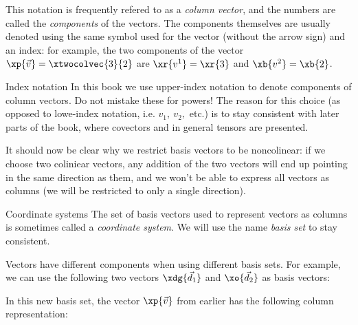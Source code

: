 This notation is frequently refered to as a \emph{column vector}, and the numbers are called the \emph{components} of the vectors. The components themselves are usually denoted using the same symbol used for the vector (without the arrow sign) and an index: for example, the two components of the vector $\xp{\vec{v}}=\xtwocolvec{3}{2}$ are $\xr{v^{1}}=\xr{3}$ and $\xb{v^{2}}=\xb{2}$.

\begin{note}{Index notation}{}
  In this book we use upper-index notation to denote components of column vectors. Do not mistake these for powers! The reason for this choice (as opposed to lowe-index notation, i.e. $v_{1},\ v_{2},$ etc.) is to stay consistent with later parts of the book, where covectors and in general tensors are presented.
\end{note}

It should now be clear why we restrict basis vectors to be noncolinear: if we choose two coliniear vectors, any addition of the two vectors will end up pointing in the same direction as them, and we won't be able to express all vectors as columns (we will be restricted to only a single direction).

\begin{note}{Coordinate systems}{}
  The set of basis vectors used to represent vectors as columns is sometimes called a \emph{coordinate system}. We will use the name \emph{basis set} to stay consistent.
\end{note}

Vectors have different components when using different basis sets. For example, we can use the following two vectors $\xdg{\vec{d}_{1}}$ and $\xo{\vec{d}_{2}}$ as basis vectors:

\begin{center}
\end{center}

In this new basis set, the vector $\xp{\vec{v}}$ from earlier has the following column representation:

